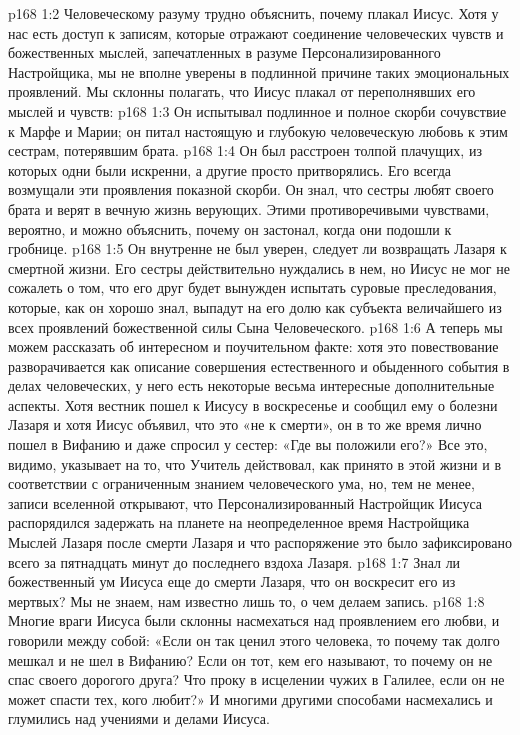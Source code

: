 \vs p168 1:2 \pc Человеческому разуму трудно объяснить, почему плакал Иисус. Хотя у нас есть доступ к записям, которые отражают соединение человеческих чувств и божественных мыслей, запечатленных в разуме Персонализированного Настройщика, мы не вполне уверены в подлинной причине таких эмоциональных проявлений. Мы склонны полагать, что Иисус плакал от переполнявших его мыслей и чувств:
\vs p168 1:3 \bibnobreakspace Он испытывал подлинное и полное скорби сочувствие к Марфе и Марии; он питал настоящую и глубокую человеческую любовь к этим сестрам, потерявшим брата.
\vs p168 1:4 \pc {}\bibnobreakspace Он был расстроен толпой плачущих, из которых одни были искренни, а другие просто притворялись. Его всегда возмущали эти проявления показной скорби. Он знал, что сестры любят своего брата и верят в вечную жизнь верующих. Этими противоречивыми чувствами, вероятно, и можно объяснить, почему он застонал, когда они подошли к гробнице.
\vs p168 1:5 \pc {}\bibnobreakspace Он внутренне не был уверен, следует ли возвращать Лазаря к смертной жизни. Его сестры действительно нуждались в нем, но Иисус не мог не сожалеть о том, что его друг будет вынужден испытать суровые преследования, которые, как он хорошо знал, выпадут на его долю как субъекта величайшего из всех проявлений божественной силы Сына Человеческого.
\vs p168 1:6 \pc А теперь мы можем рассказать об интересном и поучительном факте: хотя это повествование разворачивается как описание совершения естественного и обыденного события в делах человеческих, у него есть некоторые весьма интересные дополнительные аспекты. Хотя вестник пошел к Иисусу в воскресенье и сообщил ему о болезни Лазаря и хотя Иисус объявил, что это «не к смерти», он в то же время лично пошел в Вифанию и даже спросил у сестер: «Где вы положили его?» Все это, видимо, указывает на то, что Учитель действовал, как принято в этой жизни и в соответствии с ограниченным знанием человеческого ума, но, тем не менее, записи вселенной открывают, что Персонализированный Настройщик Иисуса распорядился задержать на планете на неопределенное время Настройщика Мыслей Лазаря после смерти Лазаря и что распоряжение это было зафиксировано всего за пятнадцать минут до последнего вздоха Лазаря.
\vs p168 1:7 Знал ли божественный ум Иисуса еще до смерти Лазаря, что он воскресит его из мертвых? Мы не знаем, нам известно лишь то, о чем делаем запись.
\vs p168 1:8 \pc Многие враги Иисуса были склонны насмехаться над проявлением его любви, и говорили между собой: «Если он так ценил этого человека, то почему так долго мешкал и не шел в Вифанию? Если он тот, кем его называют, то почему он не спас своего дорогого друга? Что проку в исцелении чужих в Галилее, если он не может спасти тех, кого любит?» И многими другими способами насмехались и глумились над учениями и делами Иисуса.
